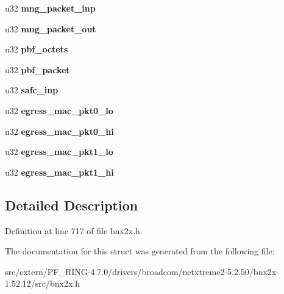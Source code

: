 \begin{DoxyCompactItemize}
\item 
\hypertarget{structnig__stats_a73e4adb38d9972b1d6cdc6b8540e21a7}{
u32 {\bfseries mng\_\-packet\_\-inp}}
\label{structnig__stats_a73e4adb38d9972b1d6cdc6b8540e21a7}

\item 
\hypertarget{structnig__stats_a17d58656b1ec92901fcdaf985a17b1ec}{
u32 {\bfseries mng\_\-packet\_\-out}}
\label{structnig__stats_a17d58656b1ec92901fcdaf985a17b1ec}

\item 
\hypertarget{structnig__stats_a3e38d4399629348329ea3d5f8edcfb46}{
u32 {\bfseries pbf\_\-octets}}
\label{structnig__stats_a3e38d4399629348329ea3d5f8edcfb46}

\item 
\hypertarget{structnig__stats_a8deec135253cc8585f64c929f06861bf}{
u32 {\bfseries pbf\_\-packet}}
\label{structnig__stats_a8deec135253cc8585f64c929f06861bf}

\item 
\hypertarget{structnig__stats_a46620c1c91d2e7bc7505bbc18e00e5f0}{
u32 {\bfseries safc\_\-inp}}
\label{structnig__stats_a46620c1c91d2e7bc7505bbc18e00e5f0}

\item 
\hypertarget{structnig__stats_a852f79e55e69854d4c839822fa5cb767}{
u32 {\bfseries egress\_\-mac\_\-pkt0\_\-lo}}
\label{structnig__stats_a852f79e55e69854d4c839822fa5cb767}

\item 
\hypertarget{structnig__stats_a09d00264c5e467f3672cf42cbfdf63fc}{
u32 {\bfseries egress\_\-mac\_\-pkt0\_\-hi}}
\label{structnig__stats_a09d00264c5e467f3672cf42cbfdf63fc}

\item 
\hypertarget{structnig__stats_a0376c9c45067fcac13a432ad20599bbc}{
u32 {\bfseries egress\_\-mac\_\-pkt1\_\-lo}}
\label{structnig__stats_a0376c9c45067fcac13a432ad20599bbc}

\item 
\hypertarget{structnig__stats_aea90bc2aa1de68f1e73c0f3797bdc1e3}{
u32 {\bfseries egress\_\-mac\_\-pkt1\_\-hi}}
\label{structnig__stats_aea90bc2aa1de68f1e73c0f3797bdc1e3}

\end{DoxyCompactItemize}


\subsection{Detailed Description}


Definition at line 717 of file bnx2x.h.



The documentation for this struct was generated from the following file:\begin{DoxyCompactItemize}
\item 
src/extern/PF\_\-RING-\/4.7.0/drivers/broadcom/netxtreme2-\/5.2.50/bnx2x-\/1.52.12/src/bnx2x.h\end{DoxyCompactItemize}
